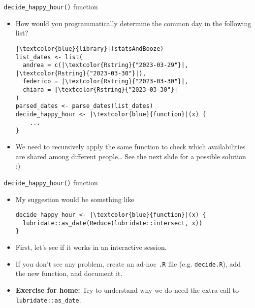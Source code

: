 \documentclass[
hyperref={bookmarks=false},
xcolor={dvipsnames,svgnames*,x11names*}, 
12pt
]{beamer}
\begin{document}
\begin{frame}[fragile]{\texttt{decide\_happy\_hour()} function}
\vspace{-0.5cm}
\begin{itemize}
\item How would you programmatically determine the common day in the following list?
\begin{lstlisting}
|\textcolor{blue}{library}|(statsAndBooze)
list_dates <- list(
  andrea = c(|\textcolor{Rstring}{"2023-03-29"}|, |\textcolor{Rstring}{"2023-03-30"}|), 
  federico = |\textcolor{Rstring}{"2023-03-30"}|,
  chiara = |\textcolor{Rstring}{"2023-03-30"}|
)
parsed_dates <- parse_dates(list_dates)
decide_happy_hour <- |\textcolor{blue}{function}|(x) {
	... 
}
\end{lstlisting}
\item We need to recursively apply the same function to check which availabilities are shared among different people\dots\; See the next slide for a possible solution :)
\end{itemize}
\end{frame}

\begin{frame}[fragile]{\texttt{decide\_happy\_hour()} function}
\vspace{-0.5cm}
\begin{itemize}
\itemsep 2ex
\item My suggestion would be something like
\begin{lstlisting}
decide_happy_hour <- |\textcolor{blue}{function}|(x) {
  lubridate::as_date(Reduce(lubridate::intersect, x))
}
\end{lstlisting}
\item First, let's see if it works in an interactive session. 
\item If you don't see any problem, create an ad-hoc \texttt{.R} file (e.g. \texttt{decide.R}), add the new function, and document it. 
\item \textbf{Exercise for home:} Try to understand why we do need the extra call to \texttt{lubridate::as\_date}.
\end{itemize}
\end{frame}
\end{document}
